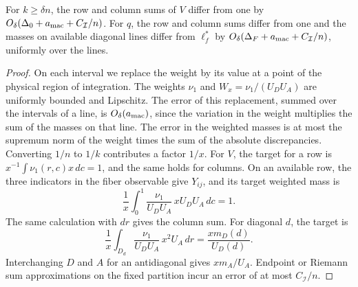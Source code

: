 \begin{lema}\label{macro:balances}
For $k\ge\delta n$, the row and column sums of $V$ differ from one by
$O_\delta(\Delta_0+a_{\rm mac}+C_{\mathcal I}/n)$. For $q$, the row and column sums differ from one
and the masses on available diagonal lines differ from $\ell_f^*$ by
$O_\delta(\Delta_F+a_{\rm mac}+C_{\mathcal I}/n)$, uniformly over the lines.
\end{lema}
\begin{proof}
On each interval we replace the weight by its value at a point of the physical region of integration.
The weights $\nu_1$ and $W_x=\nu_1/(U_DU_A)$ are uniformly bounded and Lipschitz. The error of this
replacement, summed over the intervals of a line, is $O_\delta(a_{\rm mac})$, since the variation in
the weight multiplies the sum of the masses on that line. The error in the weighted masses is at
most the supremum norm of the weight times the sum of the absolute discrepancies. Converting $1/n$
to $1/k$ contributes a factor $1/x$. For $V$, the target for a row is
$x^{-1}\int\nu_1(r,c)x\,dc=1$, and the same holds for columns. On an available row, the three
indicators in the fiber observable give $Y_{ij}$, and its target weighted mass is
\[
 \frac1x\int_0^1 \frac{\nu_1}{U_DU_A}\,xU_DU_A\,dc=1.
\]
The same calculation with $dr$ gives the column sum. For diagonal $d$, the target is
\[
 \frac1x\int_{D_d}\frac{\nu_1}{U_DU_A}\,x^2U_A\,dr
 =\frac{xm_D(d)}{U_D(d)} .
\]
Interchanging $D$ and $A$ for an antidiagonal gives $xm_A/U_A$. Endpoint or Riemann sum
approximations on the fixed partition incur an error of at most $C_{\mathcal I}/n$.
\end{proof}
